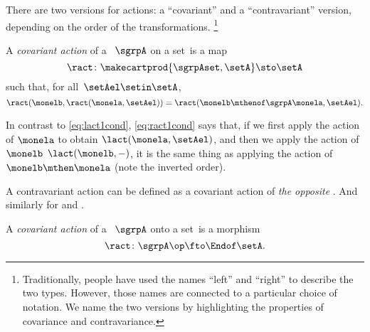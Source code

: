 There are two versions for actions: a ``covariant'' and a ``contravariant'' version, depending on the order of the transformations.
\footnote{
    Traditionally, people have used the names ``left'' and ``right'' to describe the two types.
    However, those names are connected to a particular choice of notation.
    We name the two versions by highlighting the properties of covariance and contravariance.
}

\begin{ctdefinition}
    \label{def:semigroup-contra-action-prelim}
    A \emph{covariant  action} of a ~$\sgrpA$ on a set~\setA is a map
    \begin{equation}
        \label{eq:ract}
        \ract \colon \makecartprod{\sgrpAset, \setA} \sto \setA
    \end{equation}
    such that, for all~$\setAel \setin \setA$,
    \begin{equation}
        \label{eq:ract1cond}
        \ract(\monelb, \ract(\monela, \setAel)) = \ract(\monelb \mthenof\sgrpA  \monela, \setAel).
    \end{equation}
\end{ctdefinition}

In contrast to \cref{eq:lact1cond},  \cref{eq:ract1cond} says that, if we first apply the action of $\monela$ to obtain $\lact(\monela, \setAel)$,
and then we apply the action of $\monelb$ $\lact(\monelb, -)$, it is the same thing as applying the action of $\monelb\mthen\monela$ (note the inverted order).

A contravariant  action can be defined as a covariant action of \emph{the opposite} .
And similarly for  and .


\begin{ctdefinition}
    \label{def:semigroup-cont-action}
    A \emph{covariant  action} of a ~$\sgrpA$ onto a set~\setA is a  morphism
    \begin{equation}
        \ract \colon \sgrpA\op \fto \Endof\setA.
    \end{equation}
\end{ctdefinition}

